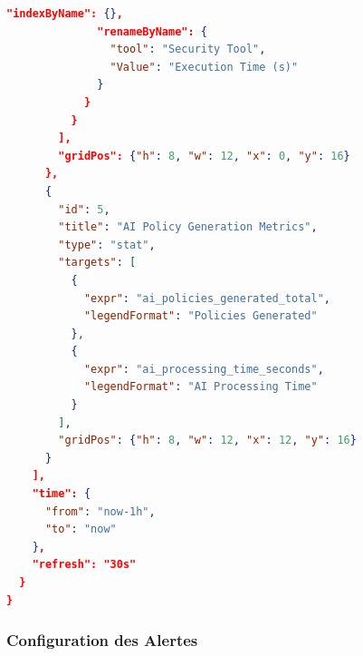 \documentclass[12pt,a4paper]{report}
\begin{document}
\begin{lstlisting}[language=json, caption=Configuration du dashboard principal DevSecOps]
              "indexByName": {},
              "renameByName": {
                "tool": "Security Tool",
                "Value": "Execution Time (s)"
              }
            }
          }
        ],
        "gridPos": {"h": 8, "w": 12, "x": 0, "y": 16}
      },
      {
        "id": 5,
        "title": "AI Policy Generation Metrics",
        "type": "stat",
        "targets": [
          {
            "expr": "ai_policies_generated_total",
            "legendFormat": "Policies Generated"
          },
          {
            "expr": "ai_processing_time_seconds",
            "legendFormat": "AI Processing Time"
          }
        ],
        "gridPos": {"h": 8, "w": 12, "x": 12, "y": 16}
      }
    ],
    "time": {
      "from": "now-1h",
      "to": "now"
    },
    "refresh": "30s"
  }
}
\end{lstlisting}

\subsubsection{Configuration des Alertes}
\end{document}
